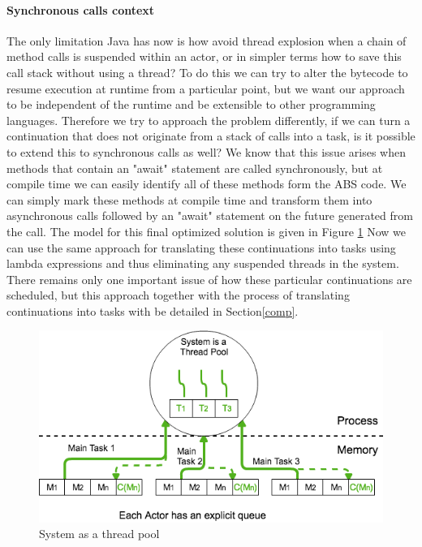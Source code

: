 \paragraph{Synchronous calls context}
The only limitation Java has now is how avoid thread explosion when a chain of method calls is suspended within an actor, or in simpler terms how to save this call stack without using a thread? To do this we can try to alter the bytecode to resume execution at runtime from a particular point, but we want our approach to be independent of the runtime and be extensible to other programming languages. Therefore we try to approach the problem differently, if we can turn a continuation that does not originate from a stack of calls into a task, is it possible to extend this to synchronous calls as well? We know that this issue arises when methods that contain an "await" statement are called synchronously, but at compile time we can easily identify all of these methods form the ABS code. We can simply mark these methods at compile time and transform them into asynchronous calls followed by an "await" statement on the future generated from the call. The model for this final optimized solution is given in Figure \ref{sol} Now we can use the same approach for translating these continuations into tasks using lambda expressions and thus eliminating any suspended threads in the system. There remains only one important issue of how these particular continuations are scheduled, but this approach together with the process of translating continuations into tasks with be detailed in Section\ref{comp}. 

\begin{figure}
	\label{sol}
	\centering
	\includegraphics[scale=0.5]{solution.png}
	\caption{System as a thread pool}
\end{figure}

